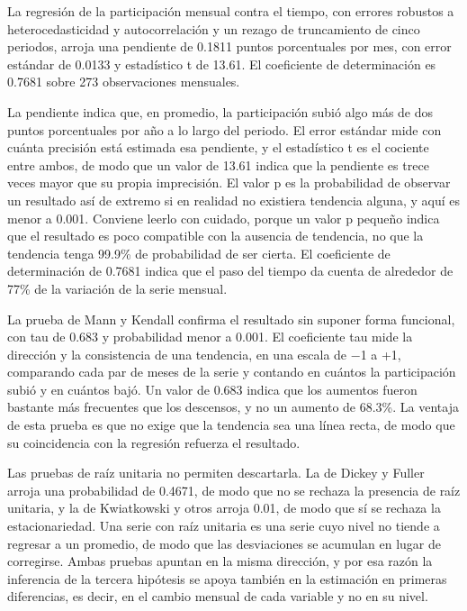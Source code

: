 
La regresión de la participación mensual contra el tiempo, con errores robustos a heterocedasticidad y autocorrelación y un rezago de truncamiento de cinco periodos, arroja una pendiente de 0.1811 puntos porcentuales por mes, con error estándar de 0.0133 y estadístico t de 13.61. El coeficiente de determinación es 0.7681 sobre 273 observaciones mensuales.

La pendiente indica que, en promedio, la participación subió algo más de dos puntos porcentuales por año a lo largo del periodo. El error estándar mide con cuánta precisión está estimada esa pendiente, y el estadístico t es el cociente entre ambos, de modo que un valor de 13.61 indica que la pendiente es trece veces mayor que su propia imprecisión. El valor p es la probabilidad de observar un resultado así de extremo si en realidad no existiera tendencia alguna, y aquí es menor a 0.001. Conviene leerlo con cuidado, porque un valor p pequeño indica que el resultado es poco compatible con la ausencia de tendencia, no que la tendencia tenga 99.9\% de probabilidad de ser cierta. El coeficiente de determinación de 0.7681 indica que el paso del tiempo da cuenta de alrededor de 77\% de la variación de la serie mensual.

La prueba de Mann y Kendall confirma el resultado sin suponer forma funcional, con tau de 0.683 y probabilidad menor a 0.001. El coeficiente tau mide la dirección y la consistencia de una tendencia, en una escala de $-$1 a +1, comparando cada par de meses de la serie y contando en cuántos la participación subió y en cuántos bajó. Un valor de 0.683 indica que los aumentos fueron bastante más frecuentes que los descensos, y no un aumento de 68.3\%. La ventaja de esta prueba es que no exige que la tendencia sea una línea recta, de modo que su coincidencia con la regresión refuerza el resultado.

Las pruebas de raíz unitaria no permiten descartarla. La de Dickey y Fuller arroja una probabilidad de 0.4671, de modo que no se rechaza la presencia de raíz unitaria, y la de Kwiatkowski y otros arroja 0.01, de modo que sí se rechaza la estacionariedad. Una serie con raíz unitaria es una serie cuyo nivel no tiende a regresar a un promedio, de modo que las desviaciones se acumulan en lugar de corregirse. Ambas pruebas apuntan en la misma dirección, y por esa razón la inferencia de la tercera hipótesis se apoya también en la estimación en primeras diferencias, es decir, en el cambio mensual de cada variable y no en su nivel.

